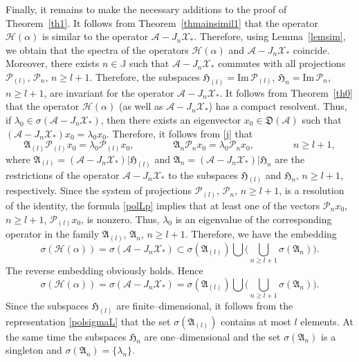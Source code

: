 \documentclass[11pt,centertags,reqno,twoside]{amsart}
\numberwithin{equation}{section}
\theoremstyle{definition}
\theoremstyle{remark}
\begin{document}
Finally, it remains to make the necessary additions to the proof of Theorem~\ref{th1}.
It follows from Theorem~\ref{thmainsimil1} that the operator $\mathcal{H}(\alpha)$
is similar to the operator $\mathcal{A}-J_n\mathcal{X}_*$. Therefore, using
Lemma~\ref{lemsim}, we obtain that the spectra of the operators $\mathcal{H}(\alpha)$
and $\mathcal{A}-J_n\mathcal{X}_*$ coincide. Moreover, there exists $n\in\mathbb{J}$
such that $\mathcal{A}-J_n\mathcal{X}_*$ commutes with all projections
$\mathcal{P}_{(l)}$, $\mathcal{P}_n$, $n\geqslant l+1$.
Therefore, the subspaces $\mathfrak{H}_{(l)}=\mathrm{Im}\,\mathcal{P}_{(l)}$,
$\mathfrak{H}_n=\mathrm{Im}\,\mathcal{P}_n$, $n\geqslant l+1$, are invariant for the operator
$\mathcal{A}-J_n\mathcal{X}_*$. It follows from Theorem~\ref{th0} that the operator
$\mathcal{H}(\alpha)$ (as well as $\mathcal{A}-J_n\mathcal{X}_*$) has a compact resolvent.
Thus, if $\lambda_0\in\sigma(\mathcal{A}-J_n\mathcal{X}_*)$, then there exists
an eigenvector $x_0\in \mathfrak{D}(\mathcal{A})$ such that
$(\mathcal{A}-J_n\mathcal{X}_*)x_0=\lambda_0x_0$. Therefore, it follows from
\eqref{j} that
\begin{equation}\label{polLp}
\mathfrak{A}_{(l)}\mathcal{P}_{(l)}x_0=\lambda_0\mathcal{P}_{(l)}x_0, \qquad
\qquad \mathfrak{A}_n\mathcal{P}_nx_0=\lambda_0\mathcal{P}_nx_0, \qquad \qquad
n\geqslant l+1,
\end{equation}
where $\mathfrak{A}_{(l)}=(\mathcal{A}-J_n\mathcal{X}_*)| \mathfrak{H}_{(l)}$ and
$\mathfrak{A}_n=(\mathcal{A}-J_n\mathcal{X}_*)|\mathfrak{H}_n$ are the restrictions
of the operator $\mathcal{A}-J_n\mathcal{X}_*$ to the subspaces
$\mathfrak{H}_{(l)}$ and $\mathfrak{H}_n$, $n\geqslant l+1$, respectively.
Since the system of projections $\mathcal{P}_{(l)}$, $\mathcal{P}_n$, $n\geqslant l+1$,
is a resolution of the identity, the formula \eqref{polLp} implies that at least one
of the vectors $\mathcal{P}_nx_0$, $n\geqslant l+1$, $\mathcal{P}_{(l)}x_0$,
is nonzero. Thus, $\lambda_0$ is an eigenvalue of the corresponding operator
in the family $\mathfrak{A}_{(l)}$, $\mathfrak{A}_n$, $n\geqslant l+1$. Therefore,
we have the embedding
\[
\sigma(\mathcal{H}(\alpha))=\sigma(\mathcal{A}-J_n\mathcal{X}_*)\subset
\sigma(\mathfrak{A}_{(l)})\bigcup \bigg(\bigcup\limits_{n\geqslant l+1}
\sigma(\mathfrak{A}_n)\bigg).
\]
The reverse embedding obviously holds. Hence
\begin{equation}\label{polsigmaL}
\sigma(\mathcal{H}(\alpha))=\sigma(\mathcal{A}-J_n\mathcal{X}_*)
= \sigma(\mathfrak{A}_{(l)})\bigcup \Big(\bigcup\limits_{n\geqslant l+1}
\sigma(\mathfrak{A}_n)\Big).
\end{equation}
Since the subspaces $\mathfrak{H}_{(l)}$ are finite--dimensional, it follows from
the representation \eqref{polsigmaL} that the set $\sigma(\mathfrak{A}_{(l)})$
contains at most $l$ elements. At the same time the subspaces $\mathfrak{H}_n$ are
one--dimensional and the set $\sigma(\mathfrak{A}_n)$ is a singleton and
$\sigma(\mathfrak{A}_n)=\{\lambda_n\}$.
\end{document}
